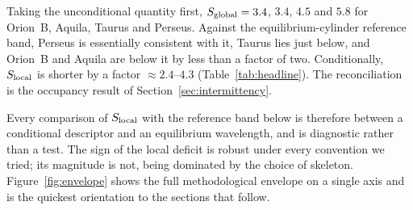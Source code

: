 \documentclass[usenatbib,twoside,twocolumn]{mnras}
\begin{document}
Taking the unconditional quantity first, $S_{\rm global}=3.4$, $3.4$, $4.5$ and $5.8$ for Orion~B, Aquila, Taurus and Perseus. Against the equilibrium-cylinder reference band, Perseus is essentially consistent with it, Taurus lies just below, and Orion~B and Aquila are below it by less than a factor of two. Conditionally, $S_{\rm local}$ is shorter by a factor $\approx2.4$--$4.3$ (Table~\ref{tab:headline}). The reconciliation is the occupancy result of Section~\ref{sec:intermittency}.

Every comparison of $S_{\rm local}$ with the reference band below is therefore between a conditional descriptor and an equilibrium wavelength, and is diagnostic rather than a test. The sign of the local deficit is robust under every convention we tried; its magnitude is not, being dominated by the choice of skeleton. Figure~\ref{fig:envelope} shows the full methodological envelope on a single axis and is the quickest orientation to the sections that follow.
\end{document}
